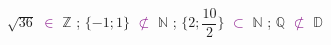 \documentclass[a4paper,11pt]{article}
\newcommand{\N}{\mathbb{N}}
\newcommand{\Z}{\mathbb{Z}}
\begin{document}
\hspace*{0.5cm}$\sqrt{36}$ \textcolor{purple}{$\in$} $\Z$ \hspace*{0.35cm}; \hspace*{0.35cm}  $\{-1;1\}$ \textcolor{purple}{$\not\subset$} $\N$ \hspace*{0.35cm}; \hspace*{0.35cm} $\{2 ; \dfrac{10}{2}\}$ \textcolor{purple}{$\subset$} $\N$ \hspace*{0.35cm}; \hspace*{0.35cm} $\mathbb{Q}$ \textcolor{purple}{$\not\subset$} $\mathbb{D}$ \\
\end{document}
